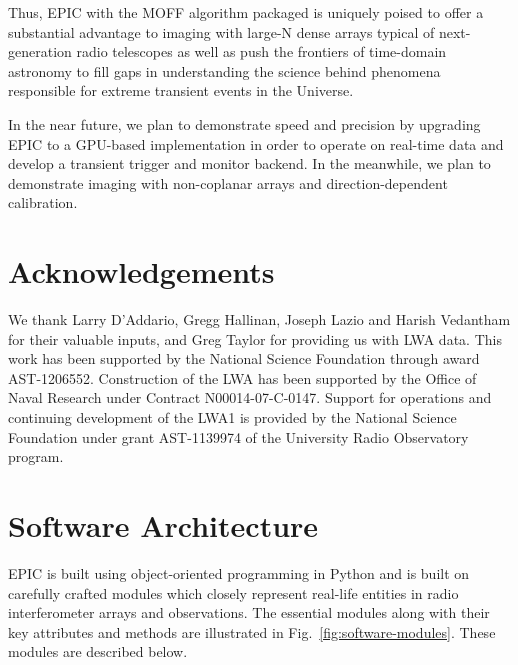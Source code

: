 \documentclass[a4paper,fleqn,usenatbib]{mnras}
\begin{document}
Thus, EPIC with the MOFF algorithm packaged is uniquely poised to offer a substantial advantage to imaging with large-N dense arrays typical of next-generation radio telescopes as well as push the frontiers of time-domain astronomy to fill gaps in understanding the science behind phenomena responsible for extreme transient events in the Universe.

In the near future, we plan to demonstrate speed and precision by upgrading EPIC to a GPU-based implementation in order to operate on real-time data and develop a transient trigger and monitor backend. In the meanwhile, we plan to demonstrate imaging with non-coplanar arrays and direction-dependent calibration.

\section*{Acknowledgements}

We thank Larry D'Addario, Gregg Hallinan, Joseph Lazio and Harish Vedantham for their valuable inputs, and Greg Taylor for providing us with LWA data. This work has been supported by the National Science Foundation through award AST-1206552. Construction of the LWA has been supported by the Office of Naval Research under Contract N00014-07-C-0147. Support for operations and continuing development of the LWA1 is provided by the National Science Foundation under grant AST-1139974 of the University Radio Observatory program.



 
%  
% 


\appendix

\section{Software Architecture}\label{sec:software-modules}

EPIC is built using object-oriented programming in Python and is built on carefully crafted modules which closely represent real-life entities in radio interferometer arrays and observations. The essential modules along with their key attributes and methods are illustrated in Fig.~\ref{fig:software-modules}. These modules are described below.
\end{document}
